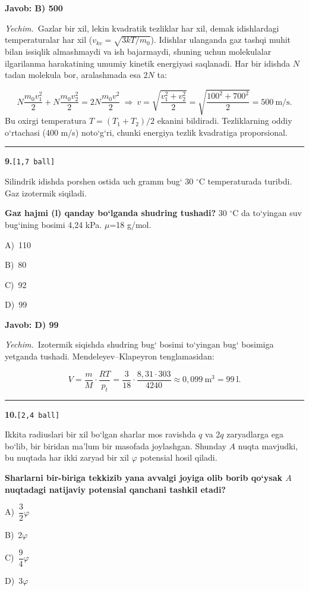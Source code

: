\documentclass[11pt,a4paper]{article}
\newcommand{\ball}[1]{\hfill\texttt{[#1 ball]}}
\newcommand{\qhead}[2]{\Needspace{10\baselineskip}\noindent\textbf{#1.}\ball{#2}\par\nopagebreak}
\newcommand{\opt}[2]{\hspace*{8mm}#1)\ #2\par}
\newenvironment{qbody}{\begin{list}{}{\leftmargin=8mm\rightmargin=0pt\topsep=0pt\itemsep=0pt\parsep=3pt}\item\relax}{\end{list}}
\begin{document}
\noindent\colorbox{gray!12}{\parbox{\dimexpr\linewidth-2\fboxsep}{\textbf{Javob: B) 500}}}\par\smallskip
\noindent\textit{Yechim.}\ Gazlar bir xil, lekin kvadratik tezliklar har xil, demak idishlardagi temperaturalar har xil ($v_{kv}=\sqrt{3kT/m_0}$). Idishlar ulanganda gaz tashqi muhit bilan issiqlik almashmaydi va ish bajarmaydi, shuning uchun molekulalar ilgarilanma harakatining umumiy kinetik energiyasi saqlanadi. Har bir idishda $N$ tadan molekula bor, aralashmada esa $2N$ ta:\par
\[N\frac{m_0v_1^2}{2}+N\frac{m_0v_2^2}{2}=2N\frac{m_0v^2}{2}\ \Rightarrow\ v=\sqrt{\frac{v_1^2+v_2^2}{2}}=\sqrt{\frac{100^2+700^2}{2}}=500\ \text{m/s}.\]
Bu oxirgi temperatura $T=(T_1+T_2)/2$ ekanini bildiradi. Tezliklarning oddiy o‘rtachasi (400 m/s) noto‘g‘ri, chunki energiya tezlik kvadratiga proporsional.\par\par\medskip\hrule\medskip
\noindent\begin{minipage}{\linewidth}
\qhead{9}{1,7}
\begin{qbody}
Silindrik idishda porshen ostida uch gramm bug‘ 30 $^\circ$C temperaturada turibdi. Gaz izotermik siqiladi.\par
\textbf{Gaz hajmi (l) qanday bo‘lganda shudring tushadi?} 30 $^\circ$C da to‘yingan suv bug‘ining bosimi 4,24 kPa. $\mu$=18 g/mol.\par
\smallskip
\opt{A}{110}
\opt{B}{80}
\opt{C}{92}
\opt{D}{99}
\end{qbody}\end{minipage}\par\vspace{2pt}
\noindent\colorbox{gray!12}{\parbox{\dimexpr\linewidth-2\fboxsep}{\textbf{Javob: D) 99}}}\par\smallskip
\noindent\textit{Yechim.}\ Izotermik siqishda shudring bug‘ bosimi to‘yingan bug‘ bosimiga yetganda tushadi. Mendeleyev–Klapeyron tenglamasidan:\par
\[V=\frac{m}{M}\cdot\frac{RT}{p_{t}}=\frac{3}{18}\cdot\frac{8{,}31\cdot303}{4240}\approx0{,}099\ \text{m}^3=99\ \text{l}.\]\par\medskip\hrule\medskip
\noindent\begin{minipage}{\linewidth}
\qhead{10}{2,4}
\begin{qbody}
Ikkita radiuslari bir xil bo‘lgan sharlar mos ravishda $q$ va 2$q$ zaryadlarga ega bo‘lib, bir biridan ma’lum bir masofada joylashgan. Shunday $A$ nuqta mavjudki, bu nuqtada har ikki zaryad bir xil $\varphi$ potensial hosil qiladi.\par
\textbf{Sharlarni bir-biriga tekkizib yana avvalgi joyiga olib borib qo‘ysak $A$ nuqtadagi natijaviy potensial qanchani tashkil etadi?}\par
\smallskip
\opt{A}{$\dfrac{3}{2}\varphi$}
\opt{B}{2$\varphi$}
\opt{C}{$\dfrac{9}{4}\varphi$}
\opt{D}{3$\varphi$}
\end{qbody}\end{minipage}\par\vspace{2pt}
\end{document}
